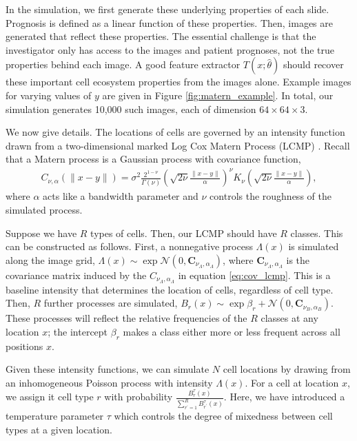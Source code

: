 In the simulation, we first generate these underlying properties of each slide.
Prognosis is defined as a linear function of these properties. Then, images are
generated that reflect these properties. The essential challenge is that the
investigator only has access to the images and patient prognoses, not the true
properties behind each image. A good feature extractor $T\left(x;
\hat{\theta}\right)$ should recover these important cell ecosystem properties
from the images alone. Example images for varying values of $y$ are given in
Figure \ref{fig:matern_example}. In total, our simulation generates 10,000 such
images, each of dimension $64 \times 64 \times 3$.

We now give details. The locations of cells are governed by an intensity
function drawn from a two-dimensional marked Log Cox Matern Process (LCMP)
\cite{diggle2013spatial}. Recall that a Matern process is a Gaussian process
with covariance function,
\begin{align}
  \label{eq:cov_lcmp}
C_{\nu, \alpha}(\|x - y\|)=\sigma^{2} \frac{2^{1-\nu}}{\Gamma(\nu)}\left(\sqrt{2 \nu} \frac{\|x - y\|}{\alpha}\right)^{\nu} K_{\nu}\left(\sqrt{2 \nu} \frac{\|x - y\|}{\alpha}\right),
\end{align}
where $\alpha$ acts like a bandwidth parameter and $\nu$ controls the roughness
of the simulated process.

Suppose we have $R$ types of cells. Then, our LCMP should have $R$ classes. This
can be constructed as follows. First, a nonnegative process
$\Lambda\left(x\right)$ is simulated along the image grid,
$\Lambda\left(x\right) \sim \exp{\mathcal{N}\left(0, \mathbf{C}_{\nu_{\Lambda},
    \alpha_{\Lambda}}\right)}$, where $\mathbf{C}_{\nu_{\Lambda},
  \alpha_{\Lambda}}$ is the covariance matrix induced by the $C_{\nu_{\Lambda},
  \alpha_{\Lambda}}$ in equation \ref{eq:cov_lcmp}. This is a baseline intensity
that determines the location of cells, regardless of cell type. Then, $R$
further processes are simulated, $B_{r}\left(x\right) \sim \exp{\beta_{r} +
  \mathcal{N}\left(0, \mathbf{C}_{\nu_{B}, \alpha_{B}}\right)} $. These
processes will reflect the relative frequencies of the $R$ classes at any
location $x$; the intercept $\beta_r$ makes a class either more or less frequent
across all positions $x$.

Given these intensity functions, we can simulate $N$ cell locations by drawing
from an inhomogeneous Poisson process with intensity $\Lambda\left(x\right)$.
For a cell at location $x$, we assign it cell type $r$ with probability
$\frac{B_{r}^{\tau}\left(x\right)}{\sum_{r^\prime = 1}^{R}
  B^{\tau}_{r^\prime}\left(x\right)}$. Here, we have introduced a temperature
parameter $\tau$ which controls the degree of mixedness between cell types at a
given location.

